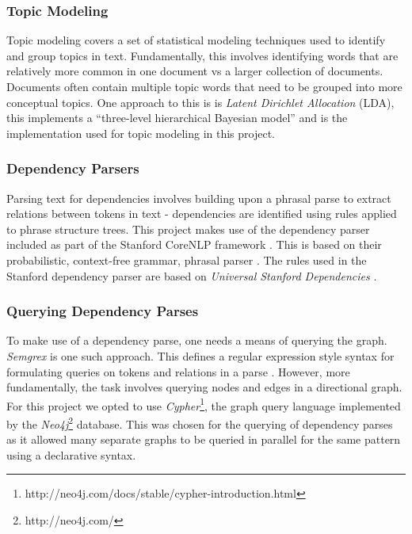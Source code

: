       \tocless\subsubsection{Topic Modeling}

        Topic modeling covers a set of statistical modeling techniques used to identify and group topics in text. Fundamentally, this involves identifying words that are relatively more common in one document vs a larger collection of documents. Documents often contain multiple topic words that need to be grouped into more conceptual topics. One approach to this is is \textit{Latent Dirichlet Allocation} (LDA), this implements a ``three-level hierarchical Bayesian model'' \cite{blei2003latent} and is the implementation used for topic modeling in this project.

      \tocless\subsubsection{Dependency Parsers}

        Parsing text for dependencies involves building upon a phrasal parse to extract relations between tokens in text - dependencies are identified using rules applied to phrase structure trees. This project makes use of the dependency parser included as part of the Stanford CoreNLP framework \cite{de2006generating}. This is based on their probabilistic, context-free grammar, phrasal parser \cite{klein2003accurate}. The rules used in the Stanford dependency parser are based on \textit{Universal Stanford Dependencies} \cite{de2014universal}.

      \tocless\subsubsection{Querying Dependency Parses}

        To make use of a dependency parse, one needs a means of querying the graph. \textit{Semgrex} is one such approach. This defines a regular expression style syntax for formulating queries on tokens and relations in a parse \cite{Chambers2007}. However, more fundamentally, the task involves querying nodes and edges in a directional graph. For this project we opted to use \textit{Cypher}\footnote{http://neo4j.com/docs/stable/cypher-introduction.html}, the graph query language implemented by the \textit{Neo4j}\footnote{http://neo4j.com/} database. This was chosen for the querying of dependency parses as it allowed many separate graphs to be queried in parallel for the same pattern using a declarative syntax.


